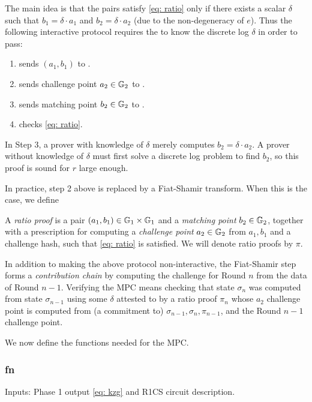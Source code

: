 The main idea is that the pairs satisfy \eqref{eq: ratio} only if there exists a scalar $\delta$ such that $b_1 = \delta \cdot a_1$ and $b_2 = \delta \cdot a_2$ (due to the non-degeneracy of $e$). Thus the following interactive protocol requires the \Prover{} to know the discrete log $\delta$ in order to pass:
\begin{enumerate}
    \item \Prover{} sends $(a_1, b_1)$ to \Verifier{}.
    \item \Verifier{} sends challenge point $a_2 \in \mathbb{G}_2$ to \Prover{}.
    \item \Prover{} sends matching point $b_2 \in \mathbb{G}_2$ to \Verifier{}.
    \item \Verifier{} checks \eqref{eq: ratio}.
\end{enumerate}
In Step 3, a prover with knowledge of $\delta$ merely computes $b_2 = \delta \cdot a_2$. A prover without knowledge of $\delta$ must first solve a discrete log problem to find $b_2$, so this proof is sound for $r$ large enough.

In practice, step 2 above is replaced by a Fiat-Shamir transform. %
When this is the case, we define
\begin{definition}
    A \emph{ratio proof} is a pair $(a_1, b_1) \in \mathbb{G}_1 \times \mathbb{G}_1$ and a \emph{matching point} $b_2 \in \mathbb{G}_2$, together with a prescription for computing a \emph{challenge point} $a_2 \in \mathbb{G}_2$ from $a_1, b_1$ and a challenge hash, such that \eqref{eq: ratio} is satisfied. We will denote ratio proofs by $\pi$.
\end{definition}

In addition to making the above protocol non-interactive, the Fiat-Shamir step forms a \emph{contribution chain} by computing the challenge for Round $n$ from the data of Round $n-1$. Verifying the MPC means checking that state $\sigma_n$ was computed from state $\sigma_{n-1}$ using some $\delta$ attested to by a ratio proof $\pi_n$ whose $a_2$ challenge point is computed from (a commitment to) $\sigma_{n-1}, \sigma_n, \pi_{n-1}$, and the Round $n-1$ challenge point. %

We now define the functions needed for the MPC.

\subsubsection*{fn \initialize{}}

Inputs: Phase 1 output \eqref{eq: kzg} and R1CS circuit description.

